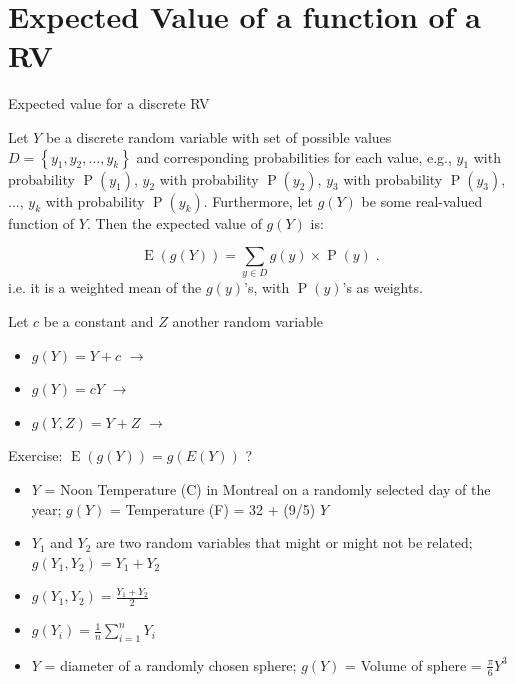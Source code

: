 \documentclass[10pt]{beamer}\usepackage[]{graphicx}\usepackage[]{color}
\newcommand{\Expec}{\operatorname{E}}
\newcommand{\Prob}{\operatorname{P}}
\begin{document}
\section{Expected Value of a function of a RV}

\begin{frame}{Expected value for a discrete RV}
	
	\begin{definition}
		Let $Y$ be a discrete random variable with set of possible values $D=\left\lbrace y_1, y_2, \ldots,y_k  \right\rbrace$ and corresponding probabilities for each value, e.g., $y_1$ with probability $\Prob(y_1)$, $y_2$ with probability $\Prob(y_2)$, $y_3$ with probability $\Prob(y_3)$, $\ldots$, $y_k$ with probability $\Prob(y_k)$. Furthermore, let $g(Y)$ be some real-valued function of $Y$. Then the expected value of $g(Y)$ is:
		
		$$\operatorname{E}(g(Y)) =  \sum_{y \in D} g(y) \times \operatorname{P}(y)\;.$$
		i.e. it is a weighted mean of the $g(y)$'s, with $\Prob(y)$'s as weights.
	\end{definition}
	\pause 
	Let $c$ be a constant and $Z$ another random variable
	\begin{itemize}
		\item $g(Y) = Y + c$ $\rightarrow$ \pause 
		\item $g(Y) = cY$ $\rightarrow$ \pause
		\item $g(Y,Z) = Y + Z$ $\rightarrow$ 
	\end{itemize}
	
\end{frame}



\begin{frame}{Exercise: $\Expec(g(Y)) = g(E(Y))$ ?}
	
\begin{itemize}[<+->]
\setlength{\itemsep}{10pt}		
\item $Y$ = Noon Temperature (C) in Montreal on a randomly selected day of the year;  
$g(Y)$ = Temperature (F) = 32 + (9/5) $Y$
\item  $Y_1$ and $Y_2$ are two random variables that might or might not be related; $g(Y_1, Y_2) = Y_1 + Y_2$ 
\item  $g(Y_1, Y_2) = \frac{Y_1 + Y_2}{2}$  
\item $g(Y_i) = \frac{1}{n} \sum_{i=1}^{n} Y_i$
\item  $Y$ = diameter of a randomly chosen sphere; $g(Y)$ = Volume of sphere = $\frac{\pi}{6}  Y^3$
\end{itemize}
	
\end{frame}
\end{document}
